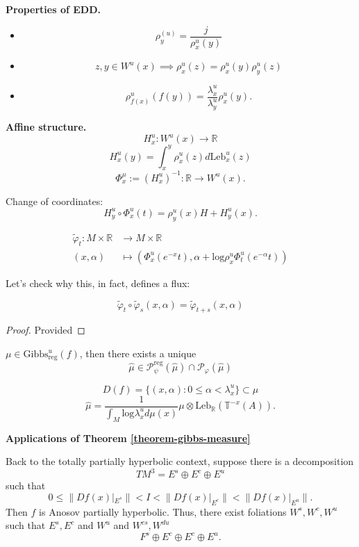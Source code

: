 \medskip\noindent
{\bf Properties of EDD.}
\begin{itemize}
\item 
$$
\rho_y^(u)
=\frac{j}{\rho^u_x(y)}
$$
\item 
$$
z,y \in W^u(x)
\implies 
\rho^u_x(z)
=\rho_x^u(y)\rho_y^u(z)
$$
\item 
$$
\rho^u_{f(x)}(f(y))
=\frac{\lambda_x^u}{\lambda_y^u}
\rho_x^u(y).
$$
\end{itemize}

\medskip\noindent
{\bf Affine structure.} 
$$
H_x^u:W^u(x) \to \mathbb{R}
$$
$$
H_x^u(y)
=\int_x^y \rho_x^u(z)
d\text{Leb}_x^u(z)
$$
$$
\Phi_x^\mu
:=(H_x^u)^{-1}
:\mathbb{R} \to W^u(x).
$$

Change of coordinates:
$$
H_y^u \circ\Phi_x^u(t)
=\rho_y^u(x)H
+H_y^u(x).
$$
\begin{definition}
\label{definition-unstable-flux}
$$
\begin{aligned}
\tilde{\varphi}_t:
M \times \mathbb{R} &\longrightarrow 
M \times \mathbb{R} \\
(x,\alpha) &\longmapsto 
(\Phi^u_x(e^{-x}t),
\alpha
+\text{log}\rho_x^u\Phi_t^u(e^{-\alpha}t))
\end{aligned}
$$
\end{definition}

\noindent
Let's check why this, in fact,
defines a flux:

\begin{lemma}
\label{lemma-defines-a-flux}
$$
\tilde{\varphi}_t \circ \tilde{\varphi}_s
(x,\alpha)=\tilde{\varphi}_{t+s}(x,\alpha)
$$
\end{lemma}

\begin{proof}
Provided
\end{proof}

\begin{theorem}
\label{theorem-gibbs-measure}
$\mu \in \text{Gibbs}_{\text{reg}}^u(f)$,
then there exists a unique
$$
\hat{\mu} 
\in \mathcal{P}_{\psi}^{\text{reg}}
(\hat{\mu}) \cap
\mathcal{P}_\varphi(\hat{\mu})
$$
\end{theorem}

$$
D(f)
=\{(x,\alpha):0\leq \alpha<\lambda_x^u\}
\subset\hat{\mu}
$$
$$
\hat{\mu}
=\frac{1}{
\int_M \text{log} \lambda_x^u
d\mu(x)}\mu\otimes\text{Leb}_{\mathbb{R}}
(\mathbb{T}^{-x}(A)).
$$

\medskip\noindent
{\bf Applications of Theorem
\ref{theorem-gibbs-measure}}

\noindent
Back to the totally partially hyperbolic
context, suppose there is a decomposition
$$
TM^3 = E^s \oplus E^c \oplus E^u
$$
such that
$$
0 \leq \|Df(x)|_{E^s}\|
<I<\|Df(x)|_{E^c}\|
<\|Df(x)|_{E^u}\|.
$$
Then $f$ is Anosov partially hyperbolic.
Thus, there exist foliations
$W^s,W^c,W^u$ such that
$E^s,E^c$ and $W^u$ and
$W^{cs}, W^{du}$
$$
F^s \oplus E^c \oplus E^c \oplus E^u.
$$

